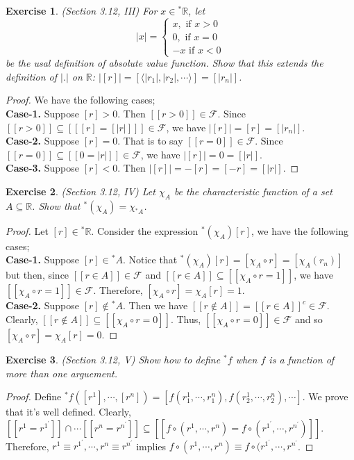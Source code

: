 \documentclass[a4paper, 11pt]{book}
\theoremstyle{plain}
\newtheorem{exercise}{Exercise}[chapter]
\theoremstyle{plain}
\newcommand{\mc}{\mathcal}
\newcommand{\R}{\mathbb{R}}
\newcommand{\la}{\langle}
\newcommand{\ra}{\rangle}
\newcommand{\p}{\prime}
\newcommand{\hyp}{{}^*}
\begin{document}
  \begin{exercise}
    (Section 3.12, III)
     For $x \in \hyp \R$, let $$|x| = \begin{cases} x, \text{ if } x>0 \\ 0, \text{ if } x=0 \\ -x \text{ if } x<0 \end{cases}$$ be the usal definition of absolute value function. Show that this extends the definition of $|.|$ on $\R$: $|[r]|=[ \la |r_1|, |r_2|,\cdots \ra]=[|r_n|]$.
  \end{exercise}
  \begin{proof}
    We have the following cases; \\
    \textbf{Case-1.} Suppose $[r]>0$. Then $[[r>0]] \in \mc{F}$. Since $[[r>0]] \subseteq [[ [r]=[|r|]]] \in \mc{F}$, we have $|[r]|=[r]=[|r_n|]$. \\
    \textbf{Case-2.} Suppose $[r]=0$. That is to say $[[r=0]] \in \mc{F}$. Since $[[r=0]] \subseteq [[0=|r|]] \in \mc{F}$, we have $|[r]|=0=[|r|]$. \\
    \textbf{Case-3.} Suppose $[r]<0$. Then $| [r]|=-[r]=[-r]=[|r|]$.
  \end{proof}

  \begin{exercise}
    (Section 3.12, IV)
    Let $\chi_A$ be the characteristic function of a set $A \subseteq \R$. Show that $\hyp (\chi_A)=\chi_{\hyp A}$.
  \end{exercise}
  \begin{proof}
    Let $[r] \in \hyp \R$. Consider the expression $\hyp (\chi_A)[r]$, we have the following cases; \\
    \textbf{Case-1.} Suppose $[r] \in \hyp A$. Notice that $\hyp (\chi_A)[r]=[\chi_A \circ r]=[\chi_A(r_n)]$ but then, since $[[r \in A]] \in \mc{F}$ and $[[r \in A]] \subseteq [[\chi_A \circ r=1]]$, we have $[[\chi_A \circ r=1]] \in \mc{F}$. Therefore, $[\chi_A \circ r]=\chi_A [r]=1$. \\
    \textbf{Case-2.} Suppose $[r] \notin \hyp A$. Then we have $[[r \notin A]]=[[r \in A]]^c \in \mc{F}$. Clearly, $[[r \notin A]] \subseteq [[\chi_A \circ r=0]]$. Thus, $[[\chi_A \circ r=0]] \in \mc{F}$ and so $[\chi_A \circ r]=\chi_A [r]=0$.
  \end{proof}
  \begin{exercise}
    (Section 3.12, V)
    Show how to define $\hyp f$ when $f$ is a function of more than one arguement.
  \end{exercise}
  \begin{proof}
    Define $\hyp f([r^1],\cdots,[r^n])=[f(r^1_1, \cdots, r^n_1),f(r^1_2,\cdots, r^n_2), \cdots]$. We prove that it's well defined. Clearly, $[[r^1=r^{1^\p}]] \cap \cdots [[r^n=r^{n^\p}]] \subseteq [[f \circ (r^1,\cdots, r^n)=f \circ (r^{1^\p}, \cdots, r^{n^\p})]]$. Therefore, $r^1 \equiv r^{1^\p}, \cdots, r^n \equiv r^{n^\p}$ implies $f \circ (r^1,\cdots, r^n) \equiv f \circ (r^{1^\p}, \cdots, r^{n^\p}$.
  \end{proof}
\end{document}
